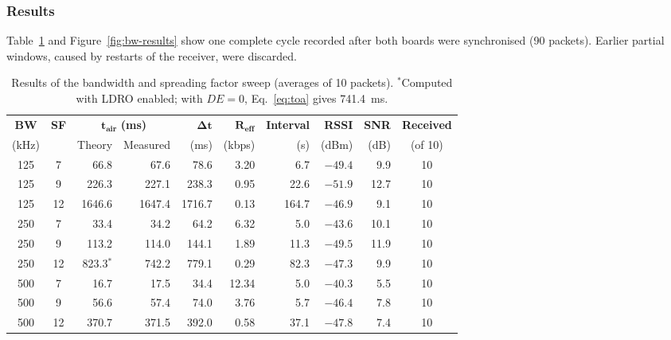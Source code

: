 \documentclass[informe,english]{plantilla}
\begin{document}
\subsubsection{Results}

Table~\ref{tab:bw-results} and Figure~\ref{fig:bw-results} show one complete cycle recorded after both boards were synchronised (90 packets). Earlier partial windows, caused by restarts of the receiver, were discarded.

\begin{table}[htbp]
    \centering
    \small
    \setlength{\tabcolsep}{4.5pt}
    \begin{tabular}{@{}cc rr r r r r r c@{}}
        \toprule
        \textbf{BW} & \textbf{SF} & \multicolumn{2}{c}{$\boldsymbol{t_{\text{air}}}$ \textbf{(ms)}} & $\boldsymbol{\Delta t}$ & $\boldsymbol{R_{\text{eff}}}$ & \textbf{Interval} & \textbf{RSSI} & \textbf{SNR} & \textbf{Received} \\
        \cmidrule(lr){3-4}
        (kHz) & & Theory & Measured & (ms) & (kbps) & (s) & (dBm) & (dB) & (of 10) \\
        \midrule
        125 & 7  & 66.8   & 67.6   & 78.6   & 3.20  & 6.7   & $-49.4$ & 9.9  & 10 \\
        125 & 9  & 226.3  & 227.1  & 238.3  & 0.95  & 22.6  & $-51.9$ & 12.7 & 10 \\
        125 & 12 & 1646.6 & 1647.4 & 1716.7 & 0.13  & 164.7 & $-46.9$ & 9.1  & 10 \\
        \midrule
        250 & 7  & 33.4   & 34.2   & 64.2   & 6.32  & 5.0   & $-43.6$ & 10.1 & 10 \\
        250 & 9  & 113.2  & 114.0  & 144.1  & 1.89  & 11.3  & $-49.5$ & 11.9 & 10 \\
        250 & 12 & 823.3$^{*}$ & 742.2 & 779.1 & 0.29 & 82.3 & $-47.3$ & 9.9  & 10 \\
        \midrule
        500 & 7  & 16.7   & 17.5   & 34.4   & 12.34 & 5.0   & $-40.3$ & 5.5  & 10 \\
        500 & 9  & 56.6   & 57.4   & 74.0   & 3.76  & 5.7   & $-46.4$ & 7.8  & 10 \\
        500 & 12 & 370.7  & 371.5  & 392.0  & 0.58  & 37.1  & $-47.8$ & 7.4  & 10 \\
        \bottomrule
    \end{tabular}
    \caption{Results of the bandwidth and spreading factor sweep (averages of 10 packets). $^{*}$Computed with LDRO enabled; with $DE = 0$, Eq.~\eqref{eq:toa} gives 741.4~ms.}
    \label{tab:bw-results}
\end{table}
\end{document}
